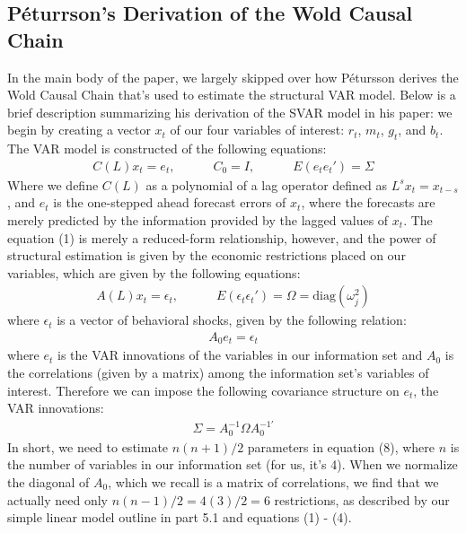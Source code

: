\documentclass[12pt,final]{article}
\begin{document}
\subsection{Péturrson's Derivation of the Wold Causal Chain}
In the main body of the paper, we largely skipped over how Pétursson derives the Wold Causal Chain that's used to estimate the structural VAR model. Below is a brief description summarizing his derivation of the SVAR model in his paper: we begin by creating a vector $x_t$ of our four variables of interest: $r_t$, $m_t$, $g_t$, and $b_t$. The VAR model is constructed of the following equations:
\begin{gather}
	C(L)x_t = e_t , \quad \quad \quad C_0 = I , \quad \quad \quad E(e_t e_t') = \Sigma
\end{gather}
Where we define $C(L)$ as a polynomial of a lag operator defined as $L^sx_t = x_{t-s}$, and $e_t$ is the one-stepped ahead forecast errors of $x_t$,  where the forecasts are merely predicted by the information provided by the lagged values of $x_t$. The equation (1) is merely a reduced-form relationship, however, and the power of structural estimation is given by the economic restrictions placed on our variables, which are given by the following equations:
\begin{gather}
	A(L)x_t = \epsilon_t, \quad \quad \quad E(\epsilon_t \epsilon_t ') = \Omega = \text{diag}(\omega_j^2)
\end{gather}
where $\epsilon_t$ is a vector of behavioral shocks, given by the following relation:
\begin{gather}
	A_0 e_t = \epsilon_t
\end{gather}
where $e_t$ is the VAR innovations of the variables in our information set and $A_0$ is the correlations (given by a matrix) among the information set's variables of interest. Therefore we can impose the following covariance structure on $e_t$, the VAR innovations:
\begin{gather}
	\Sigma = A_0^{-1}  \Omega  A_0^{-1\prime}
\end{gather}
In short, we need to estimate $n(n+1)/2$ parameters in equation (8), where $n$ is the number of variables in our information set (for us, it's 4). When we normalize the diagonal of $A_0$, which we recall is a matrix of correlations, we find that we actually need only $n(n-1)/2 = 4(3)/2 = 6$ restrictions, as described by our simple linear model outline in part 5.1 and equations (1) - (4). 
\end{document}
